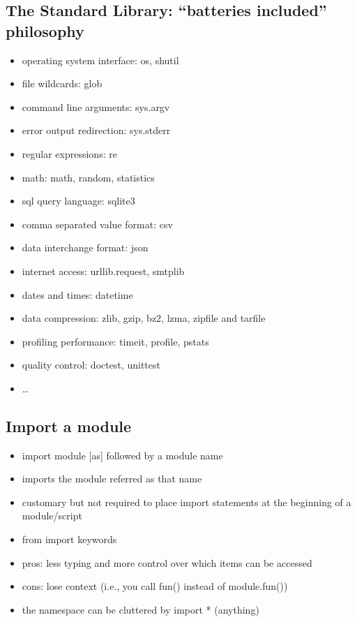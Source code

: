\documentclass[11pt]{article}
\providecommand{\tightlist}{%
      \setlength{\itemsep}{0pt}\setlength{\parskip}{0pt}}
\begin{document}
    \hypertarget{the-standard-library-batteries-included-philosophy}{%
\subsection{The Standard Library: ``batteries included''
philosophy}\label{the-standard-library-batteries-included-philosophy}}

\begin{itemize}
\tightlist
\item
  operating system interface: os, shutil
\item
  file wildcards: glob
\item
  command line arguments: sys.argv
\item
  error output redirection: sys.stderr
\item
  regular expressions: re
\item
  math: math, random, statistics
\item
  sql query language: sqlite3
\item
  comma separated value format: csv
\item
  data interchange format: json
\item
  internet access: urllib.request, smtplib
\item
  dates and times: datetime
\item
  data compression: zlib, gzip, bz2, lzma, zipfile and tarfile
\item
  profiling performance: timeit, profile, pstats
\item
  quality control: doctest, unittest
\item
  \ldots{}
\end{itemize}

    \hypertarget{import-a-module}{%
\subsection{Import a module}\label{import-a-module}}

\begin{itemize}
\tightlist
\item
  import module {[}as{]} followed by a module name
\item
  imports the module referred as that name
\item
  customary but not required to place import statements at the beginning
  of a module/script
\item
  from import keywords
\item
  pros: less typing and more control over which items can be accessed
\item
  cons: lose context (i.e., you call fun() instead of module.fun())
\item
  the namespace can be cluttered by import * (anything)
\end{itemize}
\end{document}
